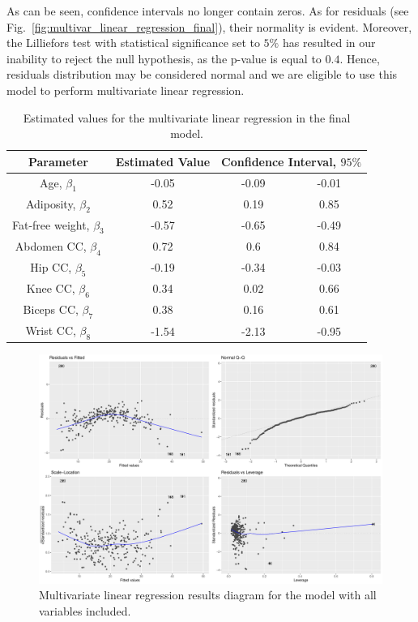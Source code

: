\documentclass[11pt,american,american]{article}
\begin{document}
\medskip

As can be seen, confidence intervals no longer contain zeros. As for residuals (see Fig.~\ref{fig:multivar_linear_regression_final}), their normality is evident. Moreover, the Lilliefors test with statistical significance set to $5\%$ has resulted in our inability to reject the null hypothesis, as the p-value is equal to $0.4$. Hence, residuals distribution may be considered normal and we are eligible to use this model to perform multivariate linear regression.

\newpage

\vspace*{\fill}
\begin{table}[ht!]
	\centering
	\begin{tabular}{|c||c||c|c|}
		\hline 
		Parameter &  Estimated Value & \multicolumn{2}{c|}{Confidence Interval, $95\%$}  \\ 
		\hline \hline 
		Age, $\beta_{1}$ & -0.05 & -0.09 &  -0.01 \\ 
		\hline 
		Adiposity, $\beta_{2}$ & 0.52 & 0.19 & 0.85  \\
		\hline 
		Fat-free weight, $\beta_{3}$ & -0.57 & -0.65 & -0.49  \\
		\hline
		Abdomen CC, $\beta_{4}$ & 0.72 & 0.6 & 0.84  \\
		\hline
		Hip CC, $\beta_{5}$ & -0.19 & -0.34 & -0.03  \\
		\hline
		Knee CC, $\beta_{6}$ & 0.34 & 0.02 & 0.66  \\
		\hline
		Biceps CC, $\beta_{7}$ & 0.38 & 0.16 & 0.61  \\
		\hline
		Wrist CC, $\beta_{8}$ & -1.54 & -2.13 & -0.95  \\
		\hline
	\end{tabular} 
	\caption{Estimated values for the multivariate linear regression in the final model.}
	\label{tab:multivar_regression_final}
\end{table}

\vspace*{\fill}

\begin{figure}[ht!]
	\centering
	\includegraphics[width=0.95\linewidth]{Images/FIGURES/multivar_linear_regression_all}
	\caption{Multivariate linear regression results diagram for the model with all variables included.}
	\label{fig:multivar_linear_regression_all}
\end{figure}
\vspace*{\fill}
\end{document}
